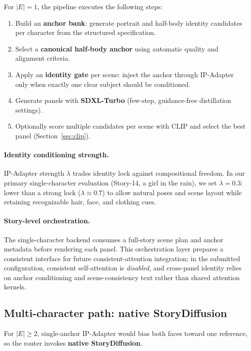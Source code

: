 For $|E|=1$, the pipeline executes the following steps:
\begin{enumerate}
  \item Build an \textbf{anchor bank}: generate portrait and half-body identity candidates per character from the structured specification.
  \item Select a \textbf{canonical half-body anchor} using automatic quality and alignment criteria.
  \item Apply an \textbf{identity gate} per scene: inject the anchor through IP-Adapter only when exactly one clear subject should be conditioned.
  \item Generate panels with \textbf{SDXL-Turbo} (few-step, guidance-free distillation settings).
  \item Optionally score multiple candidates per scene with CLIP and select the best panel (Section~\ref{sec:clip}).
\end{enumerate}

\paragraph{Identity conditioning strength.}
IP-Adapter strength $\lambda$ trades identity lock against compositional freedom.
In our primary single-character evaluation (Story-14, a girl in the rain), we set $\lambda=0.3$: lower than a strong lock ($\lambda\approx 0.7$) to allow natural poses and scene layout while retaining recognizable hair, face, and clothing cues.

\paragraph{Story-level orchestration.}
The single-character backend consumes a full-story scene plan and anchor metadata before rendering each panel.
This orchestration layer prepares a consistent interface for future consistent-attention integration; in the submitted configuration, consistent self-attention is \emph{disabled}, and cross-panel identity relies on anchor conditioning and scene-consistency text rather than shared attention kernels.

\subsection{Multi-character path: native StoryDiffusion}
\label{sec:dual}

For $|E|\geq 2$, single-anchor IP-Adapter would bias both faces toward one reference, so the router invokes \textbf{native StoryDiffusion}.

